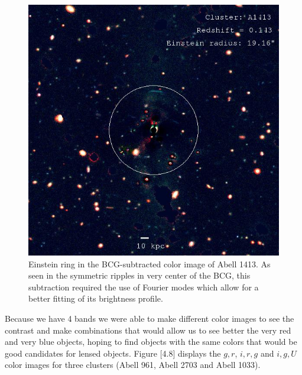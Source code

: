 \begin{figure}[H]
\centering
\includegraphics[width=15cm]{images/A1413_ring.jpg}
\caption[Einstein ring in color image of A1413]{Einstein ring in the BCG-subtracted color image of Abell 1413. As seen in the symmetric ripples in very center of the BCG, this subtraction required the use of Fourier modes which allow for a better fitting of its brightness profile.}
\end{figure}

Because we have 4 bands we were able to make different color images to see the contrast and make combinations that would allow us to see better the very red and very blue objects, hoping to find objects with the same colors that would be good candidates for lensed objects. Figure [4.8] displays the $g,r$, $i,r,g$ and $i,g,U$ color images for three clusters (Abell 961, Abell 2703 and Abell 1033). 

